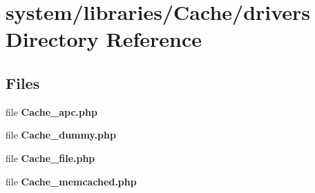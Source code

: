 \section{system/libraries/\-Cache/drivers Directory Reference}
\label{dir_3cb053bcc875b0ff9dee01f1268236d3}
\subsection*{Files}
\begin{DoxyCompactItemize}
\item 
file {\bf Cache\-\_\-apc.\-php}
\item 
file {\bf Cache\-\_\-dummy.\-php}
\item 
file {\bf Cache\-\_\-file.\-php}
\item 
file {\bf Cache\-\_\-memcached.\-php}
\end{DoxyCompactItemize}
